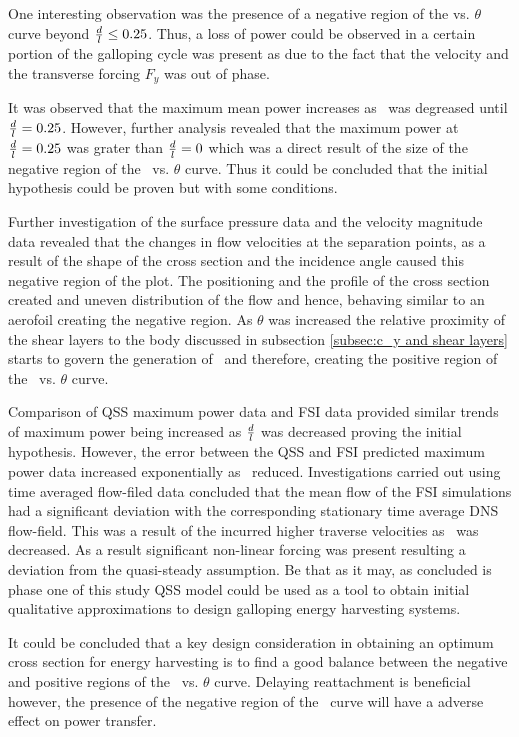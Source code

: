  One interesting observation was the presence of a negative region of the \cy vs. $\theta$ curve beyond $\frac{d}{l}\leq0.25$. Thus, a loss of power could be observed in a certain portion of the galloping cycle was present as due to the fact that the velocity and the transverse forcing $F_{y}$ was out of phase. 
 
 It was observed that the maximum mean power increases as \ratio\ was degreased until $\frac{d}{l}=0.25$. However, further analysis revealed that the maximum power at $\frac{d}{l}=0.25$ was grater than $\frac{d}{l}=0$ which was a direct result of the size of the negative region of the \cy\ vs. $\theta$ curve. Thus it could be concluded that the initial hypothesis could be proven but with some conditions.  
 
 Further investigation of the surface pressure data and the velocity magnitude data revealed that the changes in flow velocities at the separation points, as a result of the shape of the cross section and the incidence angle caused this negative region of the \cy plot. The positioning and the profile of the cross section created and uneven distribution of the flow and hence, behaving similar to an aerofoil creating the negative region. As $\theta$ was increased the relative proximity of the shear layers to the body  discussed in subsection \ref{subsec:c_y and shear layers} starts to govern the generation of \cy\ and therefore, creating the positive region of the \cy\ vs. $\theta$ curve.    
 
 Comparison of QSS maximum power data and FSI data provided similar trends of maximum power being increased as $\frac{d}{l}$ was decreased proving the initial hypothesis. However, the error between the QSS and FSI predicted maximum power data increased exponentially as \ratio\ reduced. Investigations carried out using time averaged flow-filed data concluded that the mean flow of the FSI simulations had a significant deviation with the corresponding stationary time average DNS flow-field. This was a result of the incurred higher  traverse velocities as \ratio\ was decreased. As a result significant non-linear forcing was present resulting a deviation from the quasi-steady assumption. Be that as it may, as concluded is phase one of this study QSS model could be used as a tool to obtain initial qualitative approximations to design galloping energy harvesting systems. 
 
 It could be concluded that a key design consideration in obtaining an optimum cross section for energy harvesting is to find a good balance between the negative and positive regions of the \cy\ vs. $\theta$ curve. Delaying reattachment is beneficial however, the presence of the negative region of the \cy\ curve will have a adverse effect on power transfer. 
 
